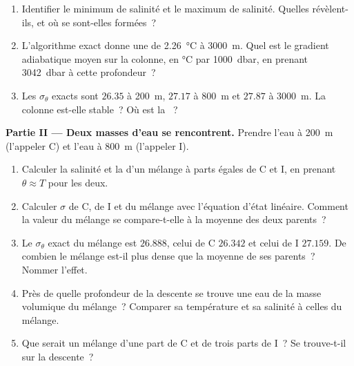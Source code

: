 \begin{problem}
\begin{enumerate}
        exacte donne $\sigma_\theta = 24.71$~: expliquer la différence.
  \item Identifier le minimum de salinité et le maximum de salinité. Quelles 
        révèlent-ils, et où se sont-elles formées~?
  \item L'algorithme exact donne une  de
        \qty{2.26}{\celsius} à \qty{3000}{m}. Quel est le gradient adiabatique moyen
        sur la colonne, en \si{\celsius} par \qty{1000}{dbar}, en prenant
        \qty{3042}{dbar} à cette profondeur~?
  \item Les $\sigma_\theta$ exacts sont $26.35$ à \qty{200}{m}, $27.17$ à
        \qty{800}{m} et $27.87$ à \qty{3000}{m}. La colonne est-elle stable~? Où
        est la ~?
\end{enumerate}

\medskip
\noindent\textbf{Partie II --- Deux masses d'eau se rencontrent.} Prendre l'eau à
\qty{200}{m} (l'appeler C) et l'eau à \qty{800}{m} (l'appeler I).
\begin{enumerate}[resume]
  \item Calculer la salinité et la  d'un mélange à parts égales
        de C et I, en prenant $\theta \approx T$ pour les deux.
  \item Calculer $\sigma$ de C, de I et du mélange avec l'équation d'état
        linéaire. Comment la valeur du mélange se compare-t-elle à la
        moyenne des deux parents~?
  \item Le $\sigma_\theta$ exact du mélange est $26.888$, celui de C $26.342$
        et celui de I $27.159$. De combien le mélange est-il plus dense que la moyenne de ses
        parents~? Nommer l'effet.
  \item Près de quelle profondeur de la descente se trouve une eau de la masse volumique du mélange~?
        Comparer sa température et sa salinité à celles du mélange.
  \item Que serait un mélange d'une part de C et de trois parts de I~? Se trouve-t-il sur
        la descente~?
\end{enumerate}


\end{problem}
